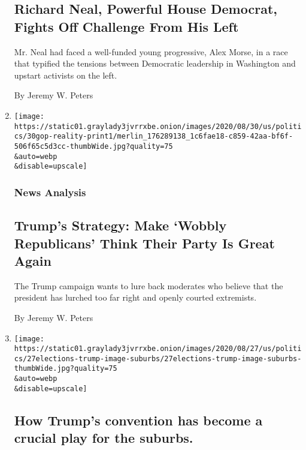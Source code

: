 \begin{enumerate}
{  \subsection{Richard Neal, Powerful House Democrat, Fights Off
  Challenge From His
  Left}\label{richard-neal-powerful-house-democrat-fights-off-challenge-from-his-left}}

  Mr. Neal had faced a well-funded young progressive, Alex Morse, in a
  race that typified the tensions between Democratic leadership in
  Washington and upstart activists on the left.

  By Jeremy W. Peters
\item
  \href{/2020/08/29/us/politics/trump-swing-voters-.html}{}

  \texttt{[image: https://static01.graylady3jvrrxbe.onion/images/2020/08/30/us/politics/30gop-reality-print1/merlin\_176289138\_1c6fae18-c859-42aa-bf6f-506f65c5d3cc-thumbWide.jpg?quality=75\\\&auto=webp\\\&disable=upscale]}

  \hypertarget{news-analysis}{%
  \subsubsection{News Analysis}\label{news-analysis}}

  \hypertarget{trumps-strategy-make-wobbly-republicans-think-their-party-is-great-again}{%
  \subsection{Trump's Strategy: Make `Wobbly Republicans' Think Their
  Party Is Great
  Again}\label{trumps-strategy-make-wobbly-republicans-think-their-party-is-great-again}}

  The Trump campaign wants to lure back moderates who believe that the
  president has lurched too far right and openly courted extremists.

  By Jeremy W. Peters
\item
  \href{/2020/08/27/us/elections/how-trumps-convention-has-become-a-crucial-play-for-the-suburbs.html}{}

  \texttt{[image: https://static01.graylady3jvrrxbe.onion/images/2020/08/27/us/politics/27elections-trump-image-suburbs/27elections-trump-image-suburbs-thumbWide.jpg?quality=75\\\&auto=webp\\\&disable=upscale]}

  \hypertarget{how-trumps-convention-has-become-a-crucial-play-for-the-suburbs}{%
  \subsection{How Trump's convention has become a crucial play for the
  suburbs.}\label{how-trumps-convention-has-become-a-crucial-play-for-the-suburbs}}


\end{enumerate}
